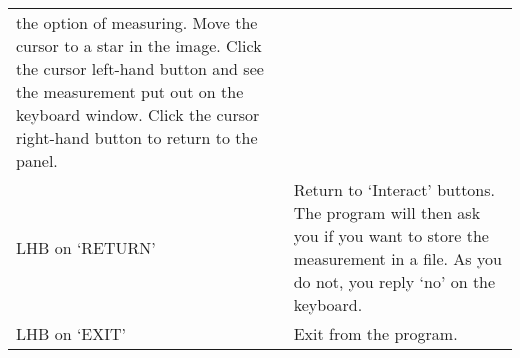 {\begin{enumerate}
\begin{tabular}{p{1.2in}p{4.3in}}
                             the option of measuring. Move the cursor to
                             a star in the image. Click the cursor left-hand
                             button and see the measurement put out
                             on the keyboard window. Click the cursor
                             right-hand button to return to the panel. \\
           LHB on `RETURN' & Return to `Interact' buttons. The program
                             will then ask you if you want to store the
                             measurement in a file. As you do not, you
                             reply `no' on the keyboard. \\
           LHB on `EXIT'   & Exit from the program. \\
      \end{tabular}


\end{enumerate}
}

\newpage



